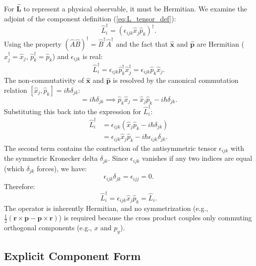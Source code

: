 For $\hat{\mathbf{L}}$ to represent a physical observable, it must be Hermitian.
We examine the adjoint of the component definition (\ref{eq:L_tensor_def}):
\begin{equation}
  \hat{L}_i^\dagger = (\epsilon_{ijk} \hat{x}_j \hat{p}_k)^\dagger.
\end{equation}
Using the property $(\hat{A}\hat{B})^\dagger = \hat{B}^\dagger \hat{A}^\dagger$
and the fact that $\hat{\mathbf{x}}$ and $\hat{\mathbf{p}}$ are Hermitian
($\hat{x}_j^\dagger = \hat{x}_j$, $\hat{p}_k^\dagger = \hat{p}_k$) and
$\epsilon_{ijk}$ is real:
\begin{equation}
  \hat{L}_i^\dagger = \epsilon_{ijk} \hat{p}_k^\dagger \hat{x}_j^\dagger =
  \epsilon_{ijk} \hat{p}_k \hat{x}_j.
\end{equation}
The non-commutativity of $\hat{\mathbf{x}}$ and $\hat{\mathbf{p}}$ is resolved
by the canonical commutation relation $[\hat{x}_j, \hat{p}_k] = i\hbar
\delta_{jk}$:
\begin{equation}
  [\hat{x}_j, \hat{p}_k] = i\hbar \delta_{jk} \implies \hat{p}_k \hat{x}_j =
  \hat{x}_j \hat{p}_k - i\hbar \delta_{jk}.
\end{equation}
Substituting this back into the expression for $\hat{L}_i^\dagger$:
\begin{align}
  \hat{L}_i^\dagger &= \epsilon_{ijk} (\hat{x}_j \hat{p}_k - i\hbar \delta_{jk})
  \nonumber \\
                    &= \epsilon_{ijk} \hat{x}_j \hat{p}_k - i\hbar \epsilon_{ijk}
  \delta_{jk}.
\end{align}
The second term contains the contraction of the antisymmetric tensor
$\epsilon_{ijk}$ with the symmetric Kronecker delta $\delta_{jk}$. Since
$\epsilon_{ijk}$ vanishes if any two indices are equal (which $\delta_{jk}$
forces), we have:
\begin{equation}
  \epsilon_{ijk} \delta_{jk} = \epsilon_{ijj} = 0.
\end{equation}
Therefore:
\begin{equation}
  \hat{L}_i^\dagger = \epsilon_{ijk} \hat{x}_j \hat{p}_k = \hat{L}_i.
\end{equation}
The operator is inherently Hermitian, and no symmetrization (e.g.,
$\frac{1}{2}(\mathbf{r}\times\mathbf{p} - \mathbf{p}\times\mathbf{r})$) is
required because the cross product couples only commuting orthogonal components
(e.g., $x$ and $p_y$).

\subsection{Explicit Component Form}

